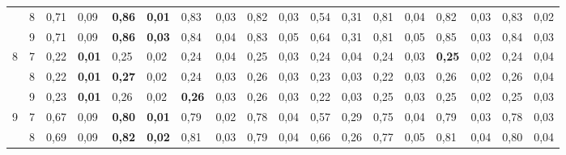 \documentclass[conference]{IEEEtran}
\begin{document}
\begin{table}[]
\begin{tabular}{|cl|ll|ll|ll|ll|ll|ll|ll|ll|}
		\multicolumn{1}{|c|}{} & 8 & \multicolumn{1}{l|}{0,71} & 0,09 & \multicolumn{1}{l|}{\textbf{0,86}} & \textbf{0,01} & \multicolumn{1}{l|}{0,83} & 0,03 & \multicolumn{1}{l|}{0,82} & 0,03 & \multicolumn{1}{l|}{0,54} & 0,31 & \multicolumn{1}{l|}{0,81} & 0,04 & \multicolumn{1}{l|}{0,82} & 0,03 & \multicolumn{1}{l|}{0,83} & 0,02 \\ \cline{2-18} 
		\multicolumn{1}{|c|}{} & 9 & \multicolumn{1}{l|}{0,71} & 0,09 & \multicolumn{1}{l|}{\textbf{0,86}} & \textbf{0,03} & \multicolumn{1}{l|}{0,84} & 0,04 & \multicolumn{1}{l|}{0,83} & 0,05 & \multicolumn{1}{l|}{0,64} & 0,31 & \multicolumn{1}{l|}{0,81} & 0,05 & \multicolumn{1}{l|}{0,85} & 0,03 & \multicolumn{1}{l|}{0,84} & 0,03 \\ \hline
		\multicolumn{1}{|c|}{\multirow{3}{*}{8}} & 7 & \multicolumn{1}{l|}{0,22} & \textbf{0,01} & \multicolumn{1}{l|}{0,25} & 0,02 & \multicolumn{1}{l|}{0,24} & 0,04 & \multicolumn{1}{l|}{0,25} & 0,03 & \multicolumn{1}{l|}{0,24} & 0,04 & \multicolumn{1}{l|}{0,24} & 0,03 & \multicolumn{1}{l|}{\textbf{0,25}} & 0,02 & \multicolumn{1}{l|}{0,24} & 0,04 \\ \cline{2-18} 
		\multicolumn{1}{|c|}{} & 8 & \multicolumn{1}{l|}{0,22} & \textbf{0,01} & \multicolumn{1}{l|}{\textbf{0,27}} & 0,02 & \multicolumn{1}{l|}{0,24} & 0,03 & \multicolumn{1}{l|}{0,26} & 0,03 & \multicolumn{1}{l|}{0,23} & 0,03 & \multicolumn{1}{l|}{0,22} & 0,03 & \multicolumn{1}{l|}{0,26} & 0,02 & \multicolumn{1}{l|}{0,26} & 0,04 \\ \cline{2-18} 
		\multicolumn{1}{|c|}{} & 9 & \multicolumn{1}{l|}{0,23} & \textbf{0,01} & \multicolumn{1}{l|}{0,26} & 0,02 & \multicolumn{1}{l|}{\textbf{0,26}} & 0,03 & \multicolumn{1}{l|}{0,26} & 0,03 & \multicolumn{1}{l|}{0,22} & 0,03 & \multicolumn{1}{l|}{0,25} & 0,03 & \multicolumn{1}{l|}{0,25} & 0,02 & \multicolumn{1}{l|}{0,25} & 0,03 \\ \hline
		\multicolumn{1}{|c|}{\multirow{3}{*}{9}} & 7 & \multicolumn{1}{l|}{0,67} & 0,09 & \multicolumn{1}{l|}{\textbf{0,80}} & \textbf{0,01} & \multicolumn{1}{l|}{0,79} & 0,02 & \multicolumn{1}{l|}{0,78} & 0,04 & \multicolumn{1}{l|}{0,57} & 0,29 & \multicolumn{1}{l|}{0,75} & 0,04 & \multicolumn{1}{l|}{0,79} & 0,03 & \multicolumn{1}{l|}{0,78} & 0,03 \\ \cline{2-18} 
		\multicolumn{1}{|c|}{} & 8 & \multicolumn{1}{l|}{0,69} & 0,09 & \multicolumn{1}{l|}{\textbf{0,82}} & \textbf{0,02} & \multicolumn{1}{l|}{0,81} & 0,03 & \multicolumn{1}{l|}{0,79} & 0,04 & \multicolumn{1}{l|}{0,66} & 0,26 & \multicolumn{1}{l|}{0,77} & 0,05 & \multicolumn{1}{l|}{0,81} & 0,04 & \multicolumn{1}{l|}{0,80} & 0,04 \\ \cline{2-18} 

\end{tabular}
\end{table}
\end{document}
